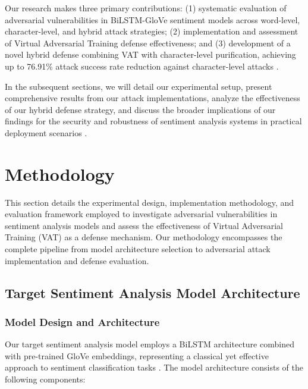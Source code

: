 \documentclass[../main.tex]{subfiles}
\begin{document}
Our research makes three primary contributions: (1) systematic evaluation of adversarial vulnerabilities in BiLSTM-GloVe sentiment models across word-level, character-level, and hybrid attack strategies; (2) implementation and assessment of Virtual Adversarial Training defense effectiveness; and (3) development of a novel hybrid defense combining VAT with character-level purification, achieving up to 76.91\% attack success rate reduction against character-level attacks \cite{miyato2017virtual}\cite{morris2020textattack}.

In the subsequent sections, we will detail our experimental setup, present comprehensive results from our attack implementations, analyze the effectiveness of our hybrid defense strategy, and discuss the broader implications of our findings for the security and robustness of sentiment analysis systems in practical deployment scenarios \cite{morris2020textattack}.





\section{Methodology}

\label{sec:sentiment_methodologyy}

This section details the experimental design, implementation methodology, and evaluation framework employed to investigate adversarial vulnerabilities in sentiment analysis models and assess the effectiveness of Virtual Adversarial Training (VAT) as a defense mechanism. Our methodology encompasses the complete pipeline from model architecture selection to adversarial attack implementation and defense evaluation.

\subsection{Target Sentiment Analysis Model Architecture}

\subsubsection{Model Design and Architecture}

Our target sentiment analysis model employs a BiLSTM architecture combined with pre-trained GloVe embeddings, representing a classical yet effective approach to sentiment classification tasks \cite{pimpalkar2022mblstmglove}. The model architecture consists of the following components:
\end{document}
